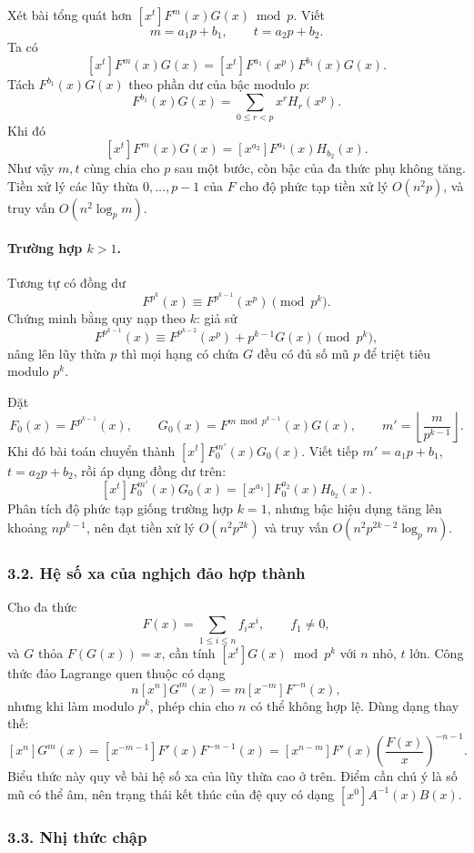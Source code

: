 \documentclass[11pt]{article}
\begin{document}
Xét bài tổng quát hơn \([x^t]F^m(x)G(x)\bmod p\). Viết
\[
  m=a_1p+b_1,\qquad t=a_2p+b_2.
\]
Ta có
\[
  [x^t]F^m(x)G(x)
  =[x^t]F^{a_1}(x^p)F^{b_1}(x)G(x).
\]
Tách \(F^{b_1}(x)G(x)\) theo phần dư của bậc modulo \(p\):
\[
  F^{b_1}(x)G(x)=\sum_{0\le r<p}x^rH_r(x^p).
\]
Khi đó
\[
  [x^t]F^m(x)G(x)=[x^{a_2}]F^{a_1}(x)H_{b_2}(x).
\]
Như vậy \(m,t\) cùng chia cho \(p\) sau một bước, còn bậc của đa thức phụ không
tăng. Tiền xử lý các lũy thừa \(0,\ldots,p-1\) của \(F\) cho độ phức tạp tiền
xử lý \(O(n^2p)\), và truy vấn \(O(n^2\log_p m)\).

\paragraph{Trường hợp \(k>1\).}
Tương tự có đồng dư
\[
  F^{p^k}(x)\equiv F^{p^{k-1}}(x^p)\pmod {p^k}.
\]
Chứng minh bằng quy nạp theo \(k\): giả sử
\[
  F^{p^{k-1}}(x)\equiv F^{p^{k-2}}(x^p)+p^{k-1}G(x)\pmod {p^k},
\]
nâng lên lũy thừa \(p\) thì mọi hạng có chứa \(G\) đều có đủ số mũ \(p\) để
triệt tiêu modulo \(p^k\).

Đặt
\[
  F_0(x)=F^{p^{k-1}}(x),\qquad
  G_0(x)=F^{m\bmod p^{k-1}}(x)G(x),\qquad
  m'=\left\lfloor\frac m{p^{k-1}}\right\rfloor .
\]
Khi đó bài toán chuyển thành \([x^t]F_0^{m'}(x)G_0(x)\). Viết tiếp
\(m'=a_1p+b_1\), \(t=a_2p+b_2\), rồi áp dụng đồng dư trên:
\[
  [x^t]F_0^{m'}(x)G_0(x)
  =[x^{a_1}]F_0^{a_2}(x)H_{b_2}(x).
\]
Phân tích độ phức tạp giống trường hợp \(k=1\), nhưng bậc hiệu dụng tăng lên
khoảng \(np^{k-1}\), nên đạt tiền xử lý \(O(n^2p^{2k})\) và truy vấn
\(O(n^2p^{2k-2}\log_p m)\).

\subsubsection*{3.2. Hệ số xa của nghịch đảo hợp thành}

Cho đa thức
\[
  F(x)=\sum_{1\le i\le n} f_ix^i,\qquad f_1\ne 0,
\]
và \(G\) thỏa \(F(G(x))=x\), cần tính \([x^t]G(x)\bmod p^k\) với \(n\) nhỏ,
\(t\) lớn. Công thức đảo Lagrange quen thuộc có dạng
\[
  n[x^n]G^m(x)=m[x^{-m}]F^{-n}(x),
\]
nhưng khi làm modulo \(p^k\), phép chia cho \(n\) có thể không hợp lệ. Dùng
dạng thay thế:
\[
  [x^n]G^m(x)=[x^{-m-1}]F'(x)F^{-n-1}(x)
  =[x^{n-m}]F'(x)\left(\frac{F(x)}x\right)^{-n-1}.
\]
Biểu thức này quy về bài hệ số xa của lũy thừa cao ở trên. Điểm cần chú ý là
số mũ có thể âm, nên trạng thái kết thúc của đệ quy có dạng
\([x^0]A^{-1}(x)B(x)\).

\subsubsection*{3.3. Nhị thức chập}
\end{document}
